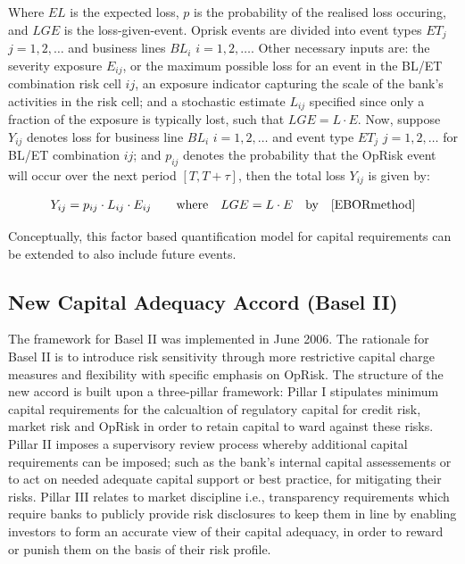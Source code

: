 \documentclass{DissertateUSU}
\begin{document}
Where \(EL\) is the expected loss, \(p\) is the probability of the
realised loss occuring, and \(LGE\) is the loss-given-event. Oprisk
events are divided into event types \(ET_j\) \(j=1,2,\ldots\) and
business lines \(BL_i\) \(i=1,2,\ldots\). Other necessary inputs are:
the severity exposure \(E_{ij}\), or the maximum possible loss for an
event in the BL/ET combination risk cell \(ij\), an exposure indicator
capturing the scale of the bank's activities in the risk cell; and a
stochastic estimate \(L_{ij}\) specified since only a fraction of the
exposure is typically lost, such that \(LGE =L\cdot E\). Now, suppose
\(Y_{ij}\) denotes loss for business line \(BL_i\) \(i=1,2,\ldots\) and
event type \(ET_j\) \(j=1,2,\ldots\) for BL/ET combination \(ij\); and
\(p_{ij}\) denotes the probability that the OpRisk event will occur over
the next period \([T,T+\tau]\), then the total loss \(Y_{ij}\) is given
by:

\singlespacing

\begin{eqnarray}\label{EBORmethodology}
Y_{ij} = p_{ij} \cdot L_{ij} \cdot E_{ij} \qquad \mbox{where} \quad LGE = L \cdot E \quad \mbox{by}\quad \ref{EBORmethod}
\end{eqnarray} \doublespacing

Conceptually, this factor based quantification model for capital
requirements can be extended to also include future events.

\subsection{New Capital Adequacy Accord (Basel II)}

The framework for Basel II was implemented in June 2006. The rationale
for Basel II is to introduce risk sensitivity through more restrictive
capital charge measures and flexibility with specific emphasis on
OpRisk. The structure of the new accord is built upon a three-pillar
framework: Pillar I stipulates minimum capital requirements for the
calcualtion of regulatory capital for credit risk, market risk and
OpRisk in order to retain capital to ward against these risks. Pillar II
imposes a supervisory review process whereby additional capital
requirements can be imposed; such as the bank's internal capital
assessements or to act on needed adequate capital support or best
practice, for mitigating their risks. Pillar III relates to market
discipline i.e., transparency requirements which require banks to
publicly provide risk disclosures to keep them in line by enabling
investors to form an accurate view of their capital adequacy, in order
to reward or punish them on the basis of their risk profile.\medskip
\end{document}
